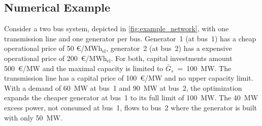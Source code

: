 \documentclass[11pt,twocolumn]{article}
\newcommand{\capacitygenerationupper}{\bar{G}_{s}}
\newcommand{\megawatthour}{MWh$_\text{el}$}
\begin{document}
% 
\subsection{Numerical Example}
\label{sec:numerical_example}
% 
Consider a two bus system, depicted in \cref{fig:example_network}, with one transmission line and one generator per bus. Generator~1 (at bus~1) has a cheap operational price of 50 \euro/\megawatthour, generator~2 (at bus~2) has a expensive operational price of 200~\euro/\megawatthour. For both, capital investments amount 500~\euro/MW and the maximal capacity is limited to $\capacitygenerationupper$~=~100~MW. The transmission line has a capital price of 100~\euro/MW and no upper capacity limit. With a demand of 60~MW at bus~1 and 90~MW at bus~2, the optimization expands the cheaper generator at bus~1 to its full limit of 100~MW. The 40~MW excess power, not consumed at bus~1, flows to bus~2 where the generator is built with only 50~MW. \\
%  
\end{document}
